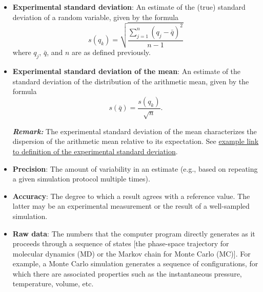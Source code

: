 \begin{itemize}
\item {\bf Experimental standard deviation}: An estimate of the (true) standard deviation of a random variable, given by the formula
  \begin{equation}
    s\left(q_k\right) = \sqrt{\dfrac{\sum_{j=1}^n\left(q_j - \bar{q}\right)^2}{n-1}} \label{def:exp_st_dev}
  \end{equation}
  where $q_j$, $\bar{q}$, and $n$ are as defined previously. 
  
\item {\bf Experimental standard deviation of the mean}: An estimate of the standard deviation of the distribution of the arithmetic mean, given by the formula
  \begin{equation}
    s\left(\bar{q}\right) = \dfrac{s\left(q_k\right)}{\sqrt{n}}. \label{def:exp_st_dev_mean}
  \end{equation}
  \smallskip
  
\textbf{\textit{Remark:}} The experimental standard deviation of the mean characterizes the dispersion of the arithmetic mean relative to its expectation.
See \hyperref[def:exp_st_dev]{example link to definition of the experimental standard deviation}.
  
\item {\bf Precision}: The amount of variability in an estimate (e.g., based on repeating a given simulation protocol multiple times).  %
  
  
\item {\bf Accuracy}: The degree to which a result agrees with a reference value.
The latter may be an experimental measurement or the result of a well-sampled simulation.  
  
\item {\bf Raw data}: The numbers that the computer program directly generates as it proceeds through a sequence of states [the phase-space trajectory for molecular dynamics (MD) or the Markov chain for Monte Carlo (MC)].
For example, a Monte Carlo simulation generates a sequence of configurations, for which there are associated properties such as the instantaneous pressure, temperature, volume, etc.
  

\end{itemize}
